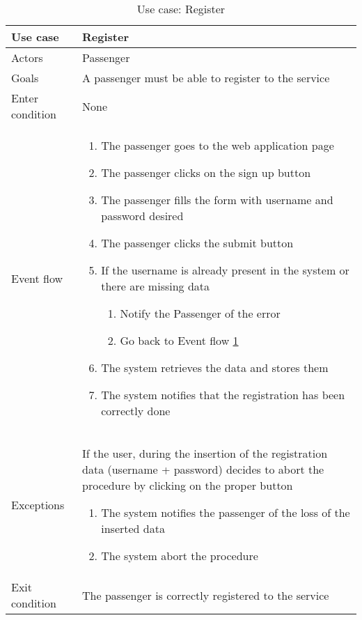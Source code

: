 \begin{table}[H]
\centering
\begin{tabularx}{\textwidth}{|l|X|} \hline
Use case & \textbf{Register} \\ \hline 
Actors & Passenger \\ \hline
Goals & A passenger must be able to register to the service \\ \hline
Enter condition & None \\ \hline
Event flow & \begin{enumerate}
				\item The passenger goes to the web application page
				\item The passenger clicks on the sign up button
				\item \label{fillForm1} The passenger fills the form with username and password desired
				\item The passenger clicks the submit button
				\item If the username is already present in the system or there are missing data
				\begin{enumerate}
					\item Notify the Passenger of the error
					\item Go back to Event flow \ref{fillForm1}
				\end{enumerate}	
				\item The system retrieves the data and stores them
				\item The system notifies that the registration has been correctly done
			\end{enumerate} \\ \hline
Exceptions & If the user, during the insertion of the registration data (username + password) decides to abort the procedure by clicking on the proper button
			\begin{enumerate}
				\item The system notifies the passenger of the loss of the inserted data
				\item The system abort the procedure
			\end{enumerate}\\ \hline
Exit condition & The passenger is correctly registered to the service \\ \hline
\end{tabularx}
\caption{Use case: Register}
\end{table}

